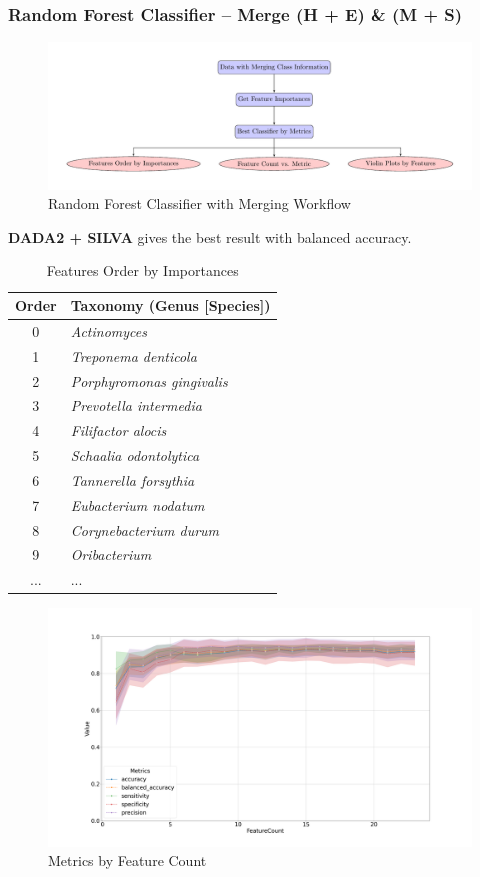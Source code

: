 \documentclass{beamer}
\begin{document}
    \begin{frame}[allowframebreaks]
        \frametitle{Random Forest Classifier -- Merge (H + E) \& (M + S)}

        \begin{figure}
            \includegraphics[width=0.8 \linewidth]{figures/RandomForest/merge.pdf}
            \caption{Random Forest Classifier with Merging Workflow}
        \end{figure}

        \textbf{DADA2 + SILVA} gives the best result with balanced accuracy.

        \begin{table}
            \caption{Features Order by Importances}
            \begin{tabular}{c|l}
                Order & Taxonomy (Genus [Species]) \\ \hline
                0 & \textit{Actinomyces} \\
                1 & \textit{Treponema denticola} \\
                2 & \textit{Porphyromonas gingivalis} \\
                3 & \textit{Prevotella intermedia} \\
                4 & \textit{Filifactor alocis} \\
                5 & \textit{Schaalia odontolytica} \\
                6 & \textit{Tannerella forsythia} \\
                7 & \textit{Eubacterium nodatum} \\
                8 & \textit{Corynebacterium durum} \\
                9 & \textit{Oribacterium} \\
                ... & ... \\
            \end{tabular}
        \end{table}

        \begin{figure}
            \includegraphics[width=0.8 \linewidth]{figures/RandomForest/one-two.DADA2.silva/metrics.png}
            \caption{Metrics by Feature Count}
        \end{figure}


\end{frame}
\end{document}
